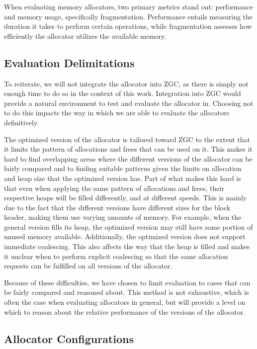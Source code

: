 
When evaluating memory allocators, two primary metrics stand out: performance and memory usage, specifically fragmentation. Performance entails measuring the duration it takes to perform certain operations, while fragmentation assesses how efficiently the allocator utilizes the available memory.

\subsection{Evaluation Delimitations}

To reiterate, we will not integrate the allocator into ZGC, as there is simply not enough time to do so in the context of this work. Integration into ZGC would provide a natural environment to test and evaluate the allocator in. Choosing not to do this impacts the way in which we are able to evaluate the allocators definitively.

The optimized version of the allocator is tailored toward ZGC to the extent that it limits the pattern of allocations and frees that can be used on it. This makes it hard to find overlapping areas where the different versions of the allocator can be fairly compared and to finding suitable patterns given the limits on allocation and heap size that the optimized version has. Part of what makes this hard is that even when applying the same pattern of allocations and frees, their respective heaps will be filled differently, and at different speeds. This is mainly due to the fact that the different versions have different sizes for the block header, making them use varying amounts of memory. For example, when the general version fills its heap, the optimized version may still have some portion of unused memory available. Additionally, the optimized version does not support immediate coalescing. This also affects the way that the heap is filled and makes it unclear when to perform explicit coalescing so that the same allocation requests can be fulfilled on all versions of the allocator.

Because of these difficulties, we have chosen to limit evaluation to cases that can be fairly compared and reasoned about. This method is not exhaustive, which is often the case when evaluating allocators in general, but will provide a level on which to reason about the relative performance of the versions of the allocator.

\newpage

\subsection{Allocator Configurations}

